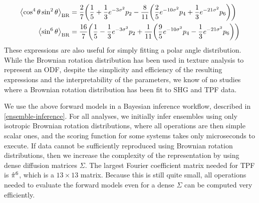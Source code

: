 \documentclass[../../main.tex]{subfiles}
\begin{document}
\begin{refsection}
\begin{align}
\begin{split}
			\left\langle \cos^4\theta \sin^2\theta \right\rangle_{\mathrm{BR}}
			&= \frac{2}{7} \qty(\frac{1}{5} + \frac{1}{3} e^{-3 \sigma^2} p_{2} - \frac{8}{11} \qty(\frac{2}{5} e^{-10 \sigma^2} p_{4} + \frac{1}{3} e^{-21 \sigma^2} p_{6}))\\
			\left\langle \sin^6\theta \right\rangle_{\mathrm{BR}}
			&= \frac{16}{7} \qty(\frac{1}{5} - \frac{1}{3} e^{-3 \sigma^2} p_{2} + \frac{1}{11} \qty(\frac{9}{5} e^{-10 \sigma^2} p_{4} - \frac{1}{3} e^{-21 \sigma^2} p_{6}))
		\end{split}
	\end{align}
	These expressions are also useful for simply fitting a polar angle distribution.
	While the Brownian rotation distribution has been used in texture analysis to represent an ODF, despite the simplicity and efficiency of the resulting expressions and the interpretability of the parameters, we know of no studies where a Brownian rotation distribution has been fit to SHG and TPF data.


	We use the above forward models in a Bayesian inference workflow, described in \cref{ensemble-inference}.
	For all analyses, we initially infer ensembles using only isotropic Brownian rotation distributions, where all operations are then simple scalar ones, and the scoring function for some systems takes only microseconds to execute.
	If data cannot be sufficiently reproduced using Brownian rotation distributions, then we increase the complexity of the representation by using dense diffusion matrices $\Sigma$.
	The largest Fourier coefficient matrix needed for TPF is $\hat{\pi}^6$, which is a $13 \times 13$ matrix.
	Because this is still quite small, all operations needed to evaluate the forward models even for a dense $\Sigma$ can be computed very efficiently.




\end{refsection}
\end{document}

